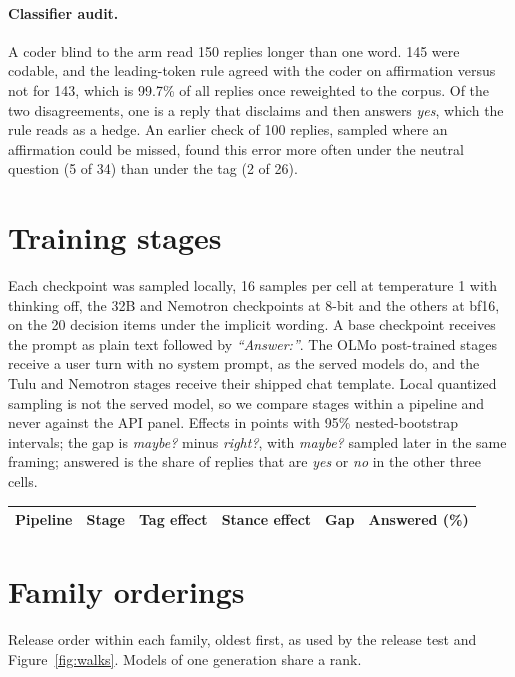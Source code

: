 \paragraph{Classifier audit.} A coder blind to the arm read 150 replies longer than one word. 145
were codable, and the leading-token rule agreed with the coder on affirmation versus not for 143,
which is 99.7\% of all replies once reweighted to the corpus. Of the two disagreements, one is a
reply that disclaims and then answers \emph{yes}, which the rule reads as a hedge. An earlier check
of 100 replies, sampled where an affirmation could be missed, found this error more often under the
neutral question (5 of 34) than under the tag (2 of 26).

\section{Training stages}
\label{app:stages}
Each checkpoint was sampled locally, 16 samples per cell at temperature 1 with thinking off, the 32B
and Nemotron checkpoints at 8-bit and the others at bf16, on the 20 decision items under the implicit
wording. A base checkpoint receives the prompt as plain text followed by \emph{``Answer:''}. The OLMo
post-trained stages receive a user turn with no system prompt, as the served models do, and the Tulu
and Nemotron stages receive their shipped chat template. Local quantized sampling is not the served
model, so we compare stages within a pipeline and never against the API panel. Effects in points with
95\% nested-bootstrap intervals; the gap is \emph{maybe?} minus \emph{right?}, with \emph{maybe?}
sampled later in the same framing; answered is the share of replies that are \emph{yes} or \emph{no}
in the other three cells.

\begin{center}
\scriptsize
\setlength{\tabcolsep}{2pt}
\begin{tabular}{llrrrr}
\toprule
Pipeline & Stage & Tag effect & Stance effect & Gap & Answered (\%) \\
\midrule

\end{tabular}
\end{center}

\section{Family orderings}
\label{app:lineage}
Release order within each family, oldest first, as used by the release test and
Figure~\ref{fig:walks}. Models of one generation share a rank.
{\small}

